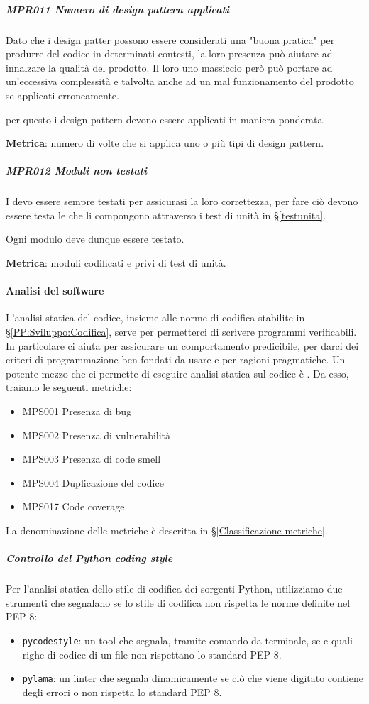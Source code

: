             \subparagraph{MPR011 Numero di design pattern applicati}
            Dato che i design patter possono essere considerati una "buona pratica" per produrre del codice in determinati contesti, la loro presenza può aiutare ad innalzare la qualità del prodotto. Il loro uno massiccio però può portare ad un'eccessiva complessità e talvolta anche ad un mal funzionamento del prodotto se applicati erroneamente.

            per questo i design pattern devono essere applicati in maniera ponderata.

            \textbf{Metrica}: numero di volte che si applica uno o più tipi di design pattern.

            \subparagraph{MPR012 Moduli non testati}
            I  devo essere sempre testati per assicurasi la loro correttezza, per fare ciò devono essere testa le  che li compongono attraverso i test di unità in \S\ref{testunita}.

            Ogni modulo deve dunque essere testato.

            \textbf{Metrica}: moduli codificati e privi di test di unità.


			\paragraph{Analisi del software} \label{analisisw}
			L'analisi statica del codice, insieme alle norme di codifica stabilite in \S\ref{PP:Sviluppo:Codifica}, serve per permetterci di scrivere programmi verificabili.
			In particolare ci aiuta per assicurare un comportamento predicibile, per darci dei criteri di programmazione ben fondati da usare e per ragioni pragmatiche.
			Un potente mezzo che ci permette di eseguire analisi statica sul codice è .
			Da esso, traiamo le seguenti metriche:
			\begin{itemize}
				\item MPS001 Presenza di bug
				\item MPS002 Presenza di vulnerabilità
				\item MPS003 Presenza di code smell
				\item MPS004 Duplicazione del codice
				\item MPS017 Code coverage
			\end{itemize}

			La denominazione delle metriche è descritta in \S\ref{Classificazione metriche}.

			\subparagraph{Controllo del Python coding style}\label{pycodestyle}
			Per l'analisi statica dello stile di codifica dei sorgenti Python, utilizziamo due strumenti che segnalano se lo stile di codifica non rispetta
			le norme definite nel PEP 8:
			\begin{itemize}
				\item \texttt{pycodestyle}: un tool che segnala, tramite comando da terminale, se e quali righe di codice di un file non rispettano lo standard PEP 8.
				\item \texttt{pylama}: un linter che segnala dinamicamente se ciò che viene digitato contiene degli errori o non rispetta
					lo standard PEP 8.
			\end{itemize}

